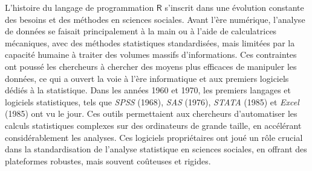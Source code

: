 \documentclass[
  letterpaper,
  DIV=11,
  numbers=noendperiod,
  oneside]{scrreprt}
\begin{document}
L'histoire du langage de programmation \(\textsf{R}\) s'inscrit dans une
évolution constante des besoins et des méthodes en sciences sociales.
Avant l'ère numérique, l'analyse de données se faisait principalement à
la main ou à l'aide de calculatrices mécaniques, avec des méthodes
statistiques standardisées, mais limitées par la capacité humaine à
traiter des volumes massifs d'informations. Ces contraintes ont poussé
les chercheurs à chercher des moyens plus efficaces de manipuler les
données, ce qui a ouvert la voie à l'ère informatique et aux premiers
logiciels dédiés à la statistique. Dans les années 1960 et 1970, les
premiers langages et logiciels statistiques, tels que \emph{SPSS}
(1968), \emph{SAS} (1976), \emph{STATA} (1985) et \emph{Excel} (1985)
ont vu le jour. Ces outils permettaient aux chercheurs d'automatiser les
calculs statistiques complexes sur des ordinateurs de grande taille, en
accélérant considérablement les analyses. Ces logiciels propriétaires
ont joué un rôle crucial dans la standardisation de l'analyse
statistique en sciences sociales, en offrant des plateformes robustes,
mais souvent coûteuses et rigides.
\end{document}
